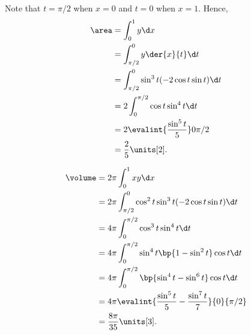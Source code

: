\begin{solution}
\begin{ppart}
\begin{center}
        \end{center}
    \end{ppart}
    \begin{ppart}
        Note that $t = \pi/2$ when $x = 0$ and $t = 0$ when $x = 1$. Hence,
        \begin{align*}
            \area &= \int_0^1 y \d x\\
            &= \int_{\pi/2}^0 y \der{x}{t} \d t\\
            &= \int_{\pi/2}^0 \sin^3 t (-2\cos t \sin t) \d t\\
            &= 2\int_0^{\pi/2} \cos t \sin^4 t \d t\\
            &= 2\evalint{\frac{\sin^5 t}{5}}0{\pi/2}\\
            &= \frac25 \units[2].
        \end{align*}
    \end{ppart}
    \begin{ppart}
        \begin{align*}
            \volume &= 2\pi \int_0^1 xy \d x\\
            &= 2\pi \int_{\pi/2}^0 \cos^2 t \sin^3 t (-2\cos t \sin t) \d t\\
            &= 4\pi \int_0^{\pi/2} \cos^3 t \sin^4 t \d t\\
            &= 4\pi \int_0^{\pi/2} \sin^4 t \bp{1 - \sin^2 t} \cos t \d t\\
            &= 4\pi \int_0^{\pi/2} \bp{\sin^4 t - \sin^6 t} \cos t \d t \\
            &= 4\pi \evalint{\frac{\sin^5 t}{5} - \frac{\sin^7 t}{7}}{0}{\pi/2}\\
            &= \frac{8\pi}{35} \units[3].
        \end{align*}
    \end{ppart}
\end{solution}

